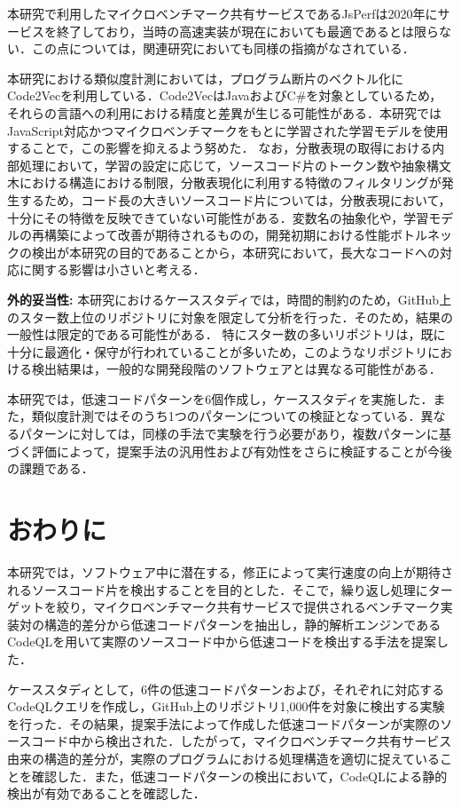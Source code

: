 \documentclass[submit,techrep,noauthor]{ipsj}
\begin{document}
本研究で利用したマイクロベンチマーク共有サービスであるJsPerfは2020年にサービスを終了しており，当時の高速実装が現在においても最適であるとは限らない．この点については，関連研究\cite{omori}においても同様の指摘がなされている．

本研究における類似度計測においては，プログラム断片のベクトル化にCode2Vecを利用している．Code2VecはJavaおよびC\#を対象としているため，それらの言語への利用における精度と差異が生じる可能性がある．本研究ではJavaScript対応かつマイクロベンチマークをもとに学習された学習モデル\cite{saiki}を使用することで，この影響を抑えるよう努めた．
なお，分散表現の取得における内部処理において，学習の設定に応じて，ソースコード片のトークン数や抽象構文木における構造における制限，分散表現化に利用する特徴のフィルタリングが発生するため，コード長の大きいソースコード片については，分散表現において，十分にその特徴を反映できていない可能性がある．変数名の抽象化や，学習モデルの再構築によって改善が期待されるものの，開発初期における性能ボトルネックの検出が本研究の目的であることから，本研究において，長大なコードへの対応に関する影響は小さいと考える．

\noindent\textbf{外的妥当性:}
本研究におけるケーススタディでは，時間的制約のため，GitHub上のスター数上位のリポジトリに対象を限定して分析を行った．そのため，結果の一般性は限定的である可能性がある．
特にスター数の多いリポジトリは，既に十分に最適化・保守が行われていることが多いため，このようなリポジトリにおける検出結果は，一般的な開発段階のソフトウェアとは異なる可能性がある．

本研究では，低速コードパターンを6個作成し，ケーススタディを実施した．また，類似度計測ではそのうち1つのパターンについての検証となっている．異なるパターンに対しては，同様の手法で実験を行う必要があり，複数パターンに基づく評価によって，提案手法の汎用性および有効性をさらに検証することが今後の課題である．


\section{おわりに}
\label{sec:summary}

本研究では，ソフトウェア中に潜在する，修正によって実行速度の向上が期待されるソースコード片を検出することを目的とした．そこで，繰り返し処理にターゲットを絞り，マイクロベンチマーク共有サービスで提供されるベンチマーク実装対の構造的差分から低速コードパターンを抽出し，静的解析エンジンであるCodeQLを用いて実際のソースコード中から低速コードを検出する手法を提案した．

ケーススタディとして，6件の低速コードパターンおよび，それぞれに対応するCodeQLクエリを作成し，GitHub上のリポジトリ1,000件を対象に検出する実験を行った．その結果，提案手法によって作成した低速コードパターンが実際のソースコード中から検出された．したがって，マイクロベンチマーク共有サービス由来の構造的差分が，実際のプログラムにおける処理構造を適切に捉えていることを確認した．また，低速コードパターンの検出において，CodeQLによる静的検出が有効であることを確認した．
\end{document}
